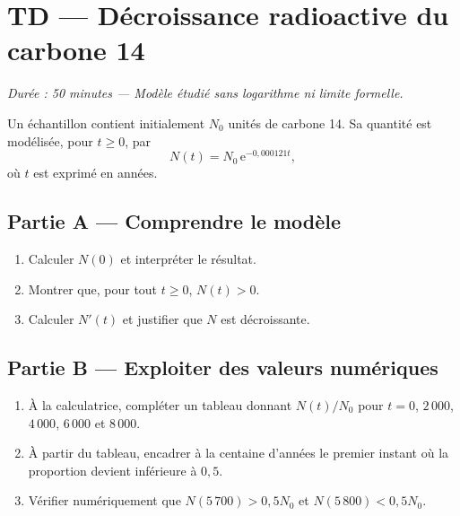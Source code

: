 
\section*{TD — Décroissance radioactive du carbone 14}
\textit{Durée : 50 minutes — Modèle étudié sans logarithme ni limite formelle.}

Un échantillon contient initialement $N_0$ unités de carbone 14. Sa quantité est modélisée, pour $t\geqslant0$, par
\[N(t)=N_0\,\mathrm{e}^{-0{,}000121t},\]
où $t$ est exprimé en années.

\subsection*{Partie A — Comprendre le modèle}
\begin{enumerate}
\item Calculer $N(0)$ et interpréter le résultat.
\item Montrer que, pour tout $t\geqslant0$, $N(t)>0$.
\item Calculer $N'(t)$ et justifier que $N$ est décroissante.
\end{enumerate}

\subsection*{Partie B — Exploiter des valeurs numériques}
\begin{enumerate}[resume]
\item À la calculatrice, compléter un tableau donnant $N(t)/N_0$ pour $t=0$, $2\,000$, $4\,000$, $6\,000$ et $8\,000$.
\item À partir du tableau, encadrer à la centaine d'années le premier instant où la proportion devient inférieure à $0{,}5$.
\item Vérifier numériquement que $N(5\,700)>0{,}5N_0$ et $N(5\,800)<0{,}5N_0$.
\end{enumerate}

